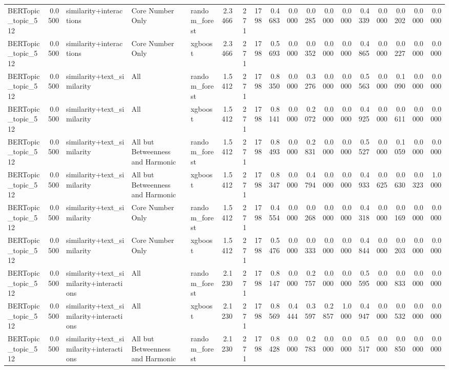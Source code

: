 \begin{tabular}{lrlllrrrrrrrrrrrrr}
BERTopic_topic_512 & 0.0500 & similarity+interactions & Core Number Only & random_forest & 2.3466 & 271 & 1798 & 0.4683 & 0.0000 & 0.0285 & 0.0000 & 0.0000 & 0.4339 & 0.0000 & 0.0202 & 0.0000 & 0.0000 \\
BERTopic_topic_512 & 0.0500 & similarity+interactions & Core Number Only & xgboost & 2.3466 & 271 & 1798 & 0.5693 & 0.0000 & 0.0352 & 0.0000 & 0.0000 & 0.4865 & 0.0000 & 0.0227 & 0.0000 & 0.0000 \\
BERTopic_topic_512 & 0.0500 & similarity+text_similarity & All & random_forest & 1.5412 & 271 & 1798 & 0.8350 & 0.0000 & 0.3276 & 0.0000 & 0.0000 & 0.5563 & 0.0000 & 0.1090 & 0.0000 & 0.0000 \\
BERTopic_topic_512 & 0.0500 & similarity+text_similarity & All & xgboost & 1.5412 & 271 & 1798 & 0.8141 & 0.0000 & 0.2072 & 0.0000 & 0.0000 & 0.4925 & 0.0000 & 0.0611 & 0.0000 & 0.0000 \\
BERTopic_topic_512 & 0.0500 & similarity+text_similarity & All but Betweenness and Harmonic & random_forest & 1.5412 & 271 & 1798 & 0.8493 & 0.0000 & 0.2831 & 0.0000 & 0.0000 & 0.5527 & 0.0000 & 0.1059 & 0.0000 & 0.0000 \\
BERTopic_topic_512 & 0.0500 & similarity+text_similarity & All but Betweenness and Harmonic & xgboost & 1.5412 & 271 & 1798 & 0.8347 & 0.0000 & 0.4794 & 0.0000 & 0.0000 & 0.4933 & 0.0625 & 0.0630 & 0.0323 & 1.0000 \\
BERTopic_topic_512 & 0.0500 & similarity+text_similarity & Core Number Only & random_forest & 1.5412 & 271 & 1798 & 0.4554 & 0.0000 & 0.0268 & 0.0000 & 0.0000 & 0.4318 & 0.0000 & 0.0169 & 0.0000 & 0.0000 \\
BERTopic_topic_512 & 0.0500 & similarity+text_similarity & Core Number Only & xgboost & 1.5412 & 271 & 1798 & 0.5476 & 0.0000 & 0.0333 & 0.0000 & 0.0000 & 0.4844 & 0.0000 & 0.0203 & 0.0000 & 0.0000 \\
BERTopic_topic_512 & 0.0500 & similarity+text_similarity+interactions & All & random_forest & 2.1230 & 271 & 1798 & 0.8147 & 0.0000 & 0.2757 & 0.0000 & 0.0000 & 0.5595 & 0.0000 & 0.0833 & 0.0000 & 0.0000 \\
BERTopic_topic_512 & 0.0500 & similarity+text_similarity+interactions & All & xgboost & 2.1230 & 271 & 1798 & 0.8569 & 0.4444 & 0.3597 & 0.2857 & 1.0000 & 0.4947 & 0.0000 & 0.0532 & 0.0000 & 0.0000 \\
BERTopic_topic_512 & 0.0500 & similarity+text_similarity+interactions & All but Betweenness and Harmonic & random_forest & 2.1230 & 271 & 1798 & 0.8428 & 0.0000 & 0.2783 & 0.0000 & 0.0000 & 0.5517 & 0.0000 & 0.0850 & 0.0000 & 0.0000 \\

\end{tabular}
